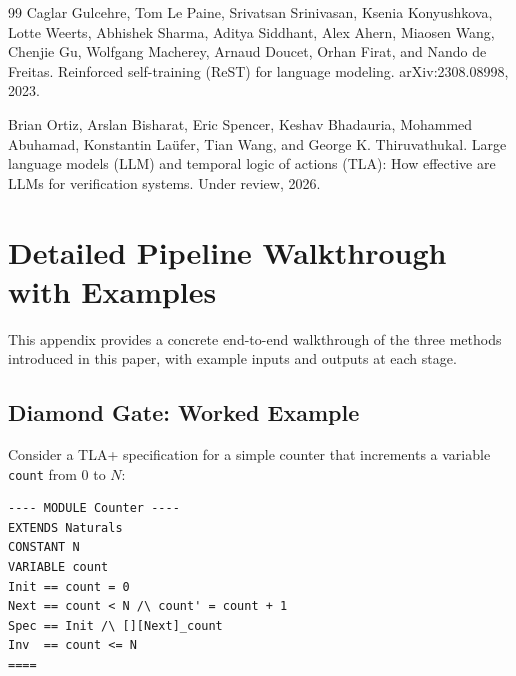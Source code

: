 \documentclass[11pt]{article}
\begin{document}
\begin{thebibliography}{99}
Caglar Gulcehre, Tom Le Paine, Srivatsan Srinivasan, Ksenia Konyushkova,
Lotte Weerts, Abhishek Sharma, Aditya Siddhant, Alex Ahern, Miaosen Wang,
Chenjie Gu, Wolfgang Macherey, Arnaud Doucet, Orhan Firat, and Nando
de Freitas.
\newblock Reinforced self-training (ReST) for language modeling.
\newblock arXiv:2308.08998, 2023.

Brian Ortiz, Arslan Bisharat, Eric Spencer, Keshav Bhadauria, Mohammed
Abuhamad, Konstantin La\"ufer, Tian Wang, and George K. Thiruvathukal.
\newblock Large language models ({LLM}) and temporal logic of actions
({TLA}): How effective are {LLM}s for verification systems.
\newblock Under review, 2026.

\end{thebibliography}

\appendix

\section{Detailed Pipeline Walkthrough with Examples}
\label{sec:pipeline-walkthrough}

This appendix provides a concrete end-to-end walkthrough of the three
methods introduced in this paper, with example inputs and outputs at
each stage.

\subsection{Diamond Gate: Worked Example}
\label{sec:app-diamond-example}

Consider a TLA+ specification for a simple counter that increments a
variable \texttt{count} from $0$ to $N$:

\begin{tcolorbox}[
  enhanced, colback=cbox, colframe=cline, boxrule=0.5pt,
  arc=2pt, left=6pt, right=6pt, top=3pt, bottom=3pt,
  title=\textbf{Example: Counter specification}, fonttitle=\small,
]
\begin{verbatim}
---- MODULE Counter ----
EXTENDS Naturals
CONSTANT N
VARIABLE count
Init == count = 0
Next == count < N /\ count' = count + 1
Spec == Init /\ [][Next]_count
Inv  == count <= N
====
\end{verbatim}
\end{tcolorbox}
\end{document}
